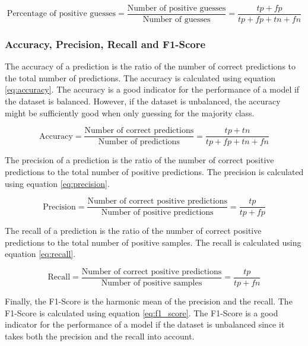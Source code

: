 \begin{equation}
    \label{eq:percentage_of_positive_guesses}
    \text{Percentage of positive guesses} = \frac{\text{Number of positive guesses}}{\text{Number of guesses}} = \frac{tp + fp}{tp + fp + tn + fn}
\end{equation}

\subsubsection{Accuracy, Precision, Recall and F1-Score}

The accuracy of a prediction is the ratio of the number of correct predictions to the total number of predictions. The accuracy is calculated using equation \ref{eq:accuracy}. The accuracy is a good indicator for the performance of a model if the dataset is balanced. However, if the dataset is unbalanced, the accuracy might be sufficiently good when only guessing for the majority class. 

\begin{equation}
    \label{eq:accuracy}
    \text{Accuracy} = \frac{\text{Number of correct predictions}}{\text{Number of predictions}} = \frac{tp + tn}{tp + fp + tn + fn}
\end{equation}

The precision of a prediction is the ratio of the number of correct positive predictions to the total number of positive predictions. The precision is calculated using equation \ref{eq:precision}.

\begin{equation}
    \label{eq:precision}
    \text{Precision} = \frac{\text{Number of correct positive predictions}}{\text{Number of positive predictions}} = \frac{tp}{tp + fp}
\end{equation}

The recall of a prediction is the ratio of the number of correct positive predictions to the total number of positive samples. The recall is calculated using equation \ref{eq:recall}.

\begin{equation}
    \label{eq:recall}
    \text{Recall} = \frac{\text{Number of correct positive predictions}}{\text{Number of positive samples}} = \frac{tp}{tp + fn}
\end{equation}

Finally, the F1-Score is the harmonic mean of the precision and the recall. The F1-Score is calculated using equation \ref{eq:f1_score}. The F1-Score is a good indicator for the performance of a model if the dataset is unbalanced since it takes both the precision and the recall into account.

